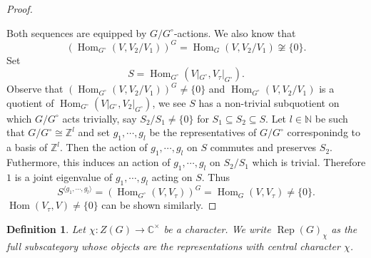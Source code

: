 \documentclass[8pt]{article}
\newtheorem{definition}{Definition}[section]
\DeclareMathOperator{\Rep}{Rep}
\DeclareMathOperator{\Hom}{Hom}
\newcommand{\N}[0]{\mathbb{N}}
\newcommand{\Z}[0]{\mathbb{Z}}
\newcommand{\C}[0]{\mathbb{C}}
\begin{document}
\begin{proof}
\begin{center}
  \end{center}
  Both sequences are equipped by $G/G^\circ$-actions. We also know that 
  \begin{equation*}
    (\Hom_{G^\circ}(V,V_2/V_1))^G = \Hom_G(V,V_2/V_1)\not\cong\{0\}.
  \end{equation*}
  Set 
  \begin{equation}
    S = \Hom_{G^\circ}(V|_{G^\circ},V_\tau|_{G^\circ}).
  \end{equation}
  Observe that $(\Hom_{G^\circ}(V,V_2/V_1))^G\not=\{0\}$ and $\Hom_{G^\circ}(V,V_2/V_1)$ is a quotient of $\Hom_{G^\circ}(V|_{G^\circ},V_2|_{G^\circ})$, we see $S$ has a non-trivial subquotient on which $G/G^\circ$ acts trivially, say $S_2/S_1\not=\{0\}$ for $S_1\subseteq S_2\subseteq S$. Let $l\in\N$ be such that $G/G^\circ \cong \Z^l$ and set $g_1,\cdots,g_l$ be the representatives of $G/G^\circ$ corresponindg to a basis of $\Z^l$.
  Then the action of $g_1,\cdots,g_l$ on $S$ commutes and preserves $S_2$. Futhermore, this induces an action of $g_1,\cdots,g_l$ on $S_2/S_1$ which is trivial. Therefore $1$ is a joint eigenvalue of $g_1,\cdots,g_l$ acting on $S$. Thus 
  \begin{equation*}
  S^{\langle g_1,\cdots,g_l\rangle} = (\Hom_{G^\circ}(V,V_\tau))^G = \Hom_G(V,V_\tau)\not=\{0\}.
  \end{equation*}
  $\Hom(V_\tau,V)\not=\{0\}$ can be shown similarly.
\end{proof}
\begin{definition}
  Let $\chi:Z(G)\to\C^\times$ be a character. We write $\Rep(G)_\chi$ as the full subscategory whose objects are the representations with central character $\chi$. 
\end{definition}
\end{document}
